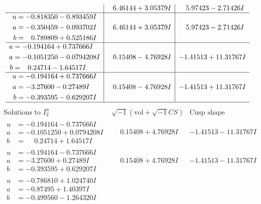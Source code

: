 \documentclass[1p]{elsarticle_modified}
\theoremstyle{definition}
\newcommand{\I}{\sqrt{-1}}
\begin{document}
$$\begin{array}{c|c|c}
 & \phantom{-}6.46144 + 3.05379 I & \phantom{-}5.97423 - 2.71426 I \\ \hline\begin{aligned}
u &= -0.818350 - 0.893459 I \\
a &= -0.350459 - 0.093702 I \\
b &= \phantom{-}0.789809 + 0.525186 I\end{aligned}
 & \phantom{-}6.46144 + 3.05379 I & \phantom{-}5.97423 - 2.71426 I \\ \hline\begin{aligned}
u &= -0.194164 + 0.737666 I \\
a &= -0.1051250 - 0.0794208 I \\
b &= \phantom{-}0.24714 - 1.64517 I\end{aligned}
 & \phantom{-}0.15408 - 4.76928 I & -1.41513 + 11.31767 I \\ \hline\begin{aligned}
u &= -0.194164 + 0.737666 I \\
a &= -3.27600 - 0.27489 I \\
b &= -0.393595 - 0.629207 I\end{aligned}
 & \phantom{-}0.15408 - 4.76928 I & -1.41513 + 11.31767 I\\
 \hline 
 \end{array}$$\newpage$$\begin{array}{c|c|c}  
\text{Solutions to }I^u_{2}& \I (\text{vol} + \sqrt{-1}CS) & \text{Cusp shape}\\
 \hline 
\begin{aligned}
u &= -0.194164 - 0.737666 I \\
a &= -0.1051250 + 0.0794208 I \\
b &= \phantom{-}0.24714 + 1.64517 I\end{aligned}
 & \phantom{-}0.15408 + 4.76928 I & -1.41513 - 11.31767 I \\ \hline\begin{aligned}
u &= -0.194164 - 0.737666 I \\
a &= -3.27600 + 0.27489 I \\
b &= -0.393595 + 0.629207 I\end{aligned}
 & \phantom{-}0.15408 + 4.76928 I & -1.41513 - 11.31767 I \\ \hline\begin{aligned}
u &= -0.786810 + 1.024740 I \\
a &= -0.87495 + 1.40397 I \\
b &= -0.499560 - 1.264320 I\end{aligned}

\end{array}$$
\end{document}
